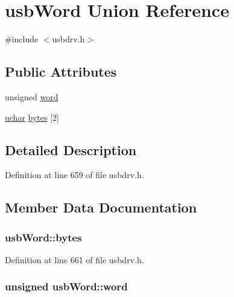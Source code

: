 \hypertarget{unionusb_word}{\section{usb\-Word Union Reference}
\label{unionusb_word}
}


{\ttfamily \#include $<$usbdrv.\-h$>$}

\subsection*{Public Attributes}
\begin{DoxyCompactItemize}
\item 
unsigned \hyperlink{unionusb_word_a5c18356318175be1ad83c8acab90bf66}{word}
\item 
\hyperlink{mhvlib-_vusb-_console_2vusb_2usbdrv_8h_aa8ddf20cdd716b652e76e23e5e700893}{uchar} \hyperlink{unionusb_word_a0497f26dcfc6fb20080f21103e6696dc}{bytes} \mbox{[}2\mbox{]}
\end{DoxyCompactItemize}


\subsection{Detailed Description}


Definition at line 659 of file usbdrv.\-h.



\subsection{Member Data Documentation}
\hypertarget{unionusb_word_a0497f26dcfc6fb20080f21103e6696dc}{
\subsubsection[{bytes}]{ usb\-Word\-::bytes}}\label{unionusb_word_a0497f26dcfc6fb20080f21103e6696dc}


Definition at line 661 of file usbdrv.\-h.

\hypertarget{unionusb_word_a5c18356318175be1ad83c8acab90bf66}{
\subsubsection[{word}]{\setlength{\rightskip}{0pt plus 5cm}unsigned usb\-Word\-::word}}\label{unionusb_word_a5c18356318175be1ad83c8acab90bf66}


